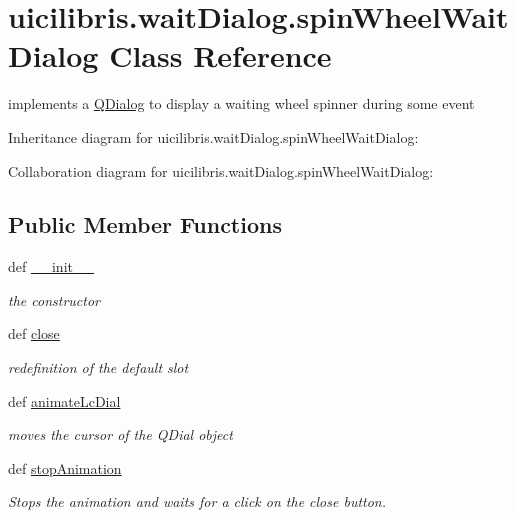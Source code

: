 \hypertarget{classuicilibris_1_1waitDialog_1_1spinWheelWaitDialog}{\section{uicilibris.\-wait\-Dialog.\-spin\-Wheel\-Wait\-Dialog \-Class \-Reference}
\label{classuicilibris_1_1waitDialog_1_1spinWheelWaitDialog}
}


implements a \hyperlink{classQDialog}{\-Q\-Dialog} to display a waiting wheel spinner during some event  




\-Inheritance diagram for uicilibris.\-wait\-Dialog.\-spin\-Wheel\-Wait\-Dialog\-:


\-Collaboration diagram for uicilibris.\-wait\-Dialog.\-spin\-Wheel\-Wait\-Dialog\-:
\subsection*{\-Public \-Member \-Functions}
\begin{DoxyCompactItemize}
\item 
def \hyperlink{classuicilibris_1_1waitDialog_1_1spinWheelWaitDialog_a3467633739c1c42bc26866c8f5523a5e}{\-\_\-\-\_\-init\-\_\-\-\_\-}
\begin{DoxyCompactList}\small\item\em the constructor \end{DoxyCompactList}\item 
def \hyperlink{classuicilibris_1_1waitDialog_1_1spinWheelWaitDialog_addce2cc0b9b1edcfa82f37abf27fb5a7}{close}
\begin{DoxyCompactList}\small\item\em redefinition of the default slot \end{DoxyCompactList}\item 
def \hyperlink{classuicilibris_1_1waitDialog_1_1spinWheelWaitDialog_a8b457fed7f0d78457b08486746a8ea4b}{animate\-Lc\-Dial}
\begin{DoxyCompactList}\small\item\em moves the cursor of the \-Q\-Dial object \end{DoxyCompactList}\item 
def \hyperlink{classuicilibris_1_1waitDialog_1_1spinWheelWaitDialog_a833c2817deb73f7eee7cf3a1ec836cfb}{stop\-Animation}
\begin{DoxyCompactList}\small\item\em \-Stops the animation and waits for a click on the close button. \end{DoxyCompactList}\end{DoxyCompactItemize}
